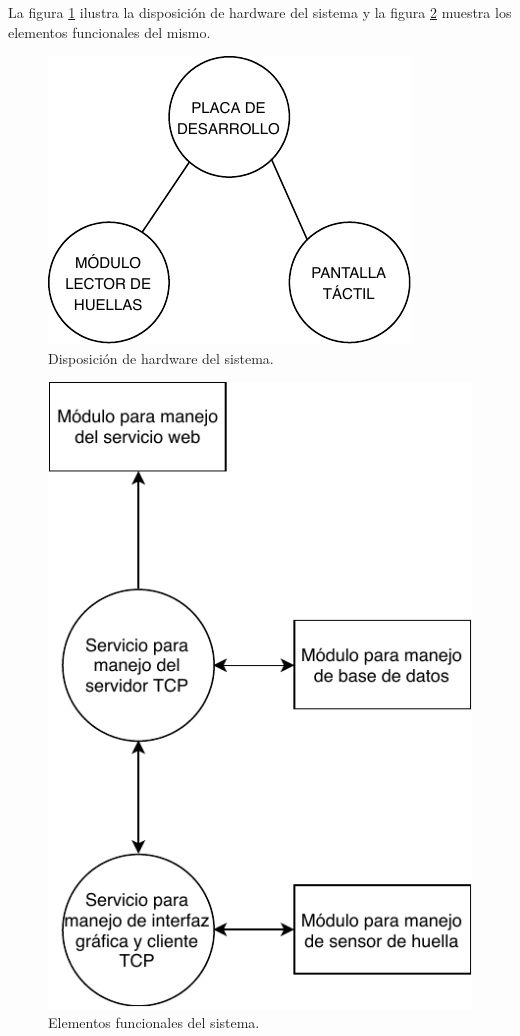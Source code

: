 La figura \ref{fig:hard_disp} ilustra la disposición de hardware del sistema y la figura \ref{fig:modulos} muestra los elementos funcionales del mismo.
\begin{figure}[H]
	\centering
	\includegraphics[scale=1]{./Figures/hard_disp.pdf}
	\caption{Disposición de hardware del sistema.}
	\label{fig:hard_disp}
\end{figure}
\begin{figure}[H]
	\centering
	\includegraphics[scale=1]{./Figures/modulos.pdf}
	\caption{Elementos funcionales del sistema.}
	\label{fig:modulos}
\end{figure}

